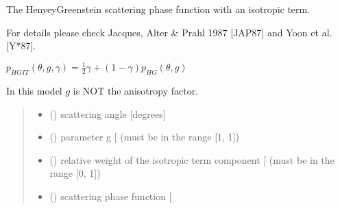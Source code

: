 \documentclass[letterpaper,10pt,english]{sphinxmanual}
\begin{document}

\begin{fulllineitems}
\label{\detokenize{06_anisotropy_factor:skinoptics.anisotropy_factor.ptheta_HGIT}}
\pysigstartsignatures
{}
\pysigstopsignatures
\begin{DUlineblock}{0em}
\item[] The Henyey\sphinxhyphen{}Greenstein scattering phase function with an isotropic term.
\item[] For details please check Jacques, Alter \& Prahl 1987 {[}JAP87{]} and Yoon et al. {[}Y*87{]}.
\end{DUlineblock}

\sphinxAtStartPar
\(p_{HGIT}(\theta, g, \gamma) = \frac{1}{2}\gamma + (1-\gamma) p_{HG}(\theta, g)\)

\sphinxAtStartPar
In this model \(g\) is NOT the anisotropy factor.
\begin{quote}\begin{description}
\begin{itemize}
\item {} 
\sphinxAtStartPar
{} () \textendash{} scattering angle {[}degrees{]}

\item {} 
\sphinxAtStartPar
{} () \textendash{} parameter g {[}\sphinxhyphen{}{]} (must be in the range {[}\sphinxhyphen{}1, 1{]})

\item {} 
\sphinxAtStartPar
{} () \textendash{} relative weight of the isotropic term component {[}\sphinxhyphen{}{]} (must be in the range {[}0, 1{]})

\end{itemize}

\sphinxAtStartPar
\begin{itemize}
\item {} 
\sphinxAtStartPar
{} () \textendash{} scattering phase function {[}\sphinxhyphen{}{]}

\end{itemize}


\end{description}\end{quote}

\end{fulllineitems}
\end{document}

